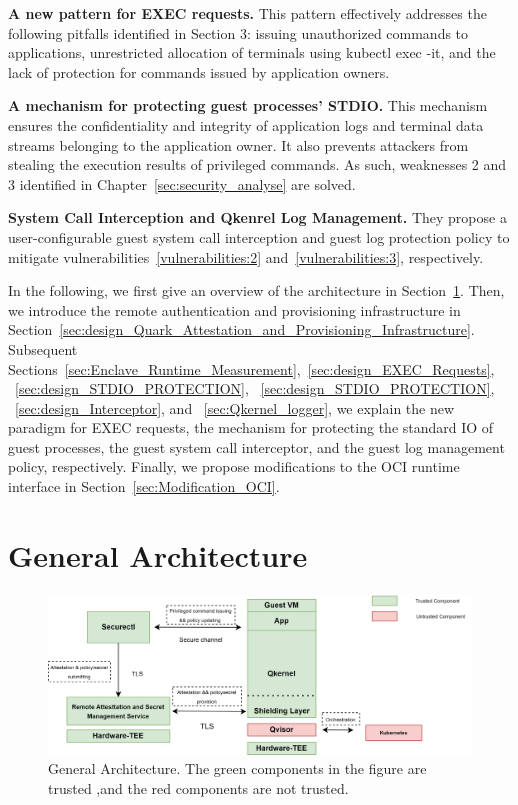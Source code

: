 \textbf{A new pattern for EXEC requests.} This pattern effectively addresses the following pitfalls identified in Section 3: issuing unauthorized commands to applications, unrestricted allocation of terminals using kubectl exec -it, and the lack of protection for commands issued by application owners.

\textbf{A mechanism for protecting guest processes' STDIO.} This mechanism ensures the confidentiality and integrity of application logs and terminal data streams belonging to the application owner. It also prevents attackers from stealing the execution results of privileged commands. As such, weaknesses 2 and 3 identified in Chapter~\ref{sec:security_analyse} are solved.

\textbf{System Call Interception and Qkenrel Log Management.} They propose a user-configurable guest system call interception and guest log protection policy to mitigate vulnerabilities~\ref{vulnerabilities:2} and~\ref{vulnerabilities:3}, respectively.
 
In the following, we first give an overview of the architecture in Section~\ref{sec:General_Architecture}. Then, we introduce the remote authentication and provisioning infrastructure in Section~\ref{sec:design_Quark_Attestation_and_Provisioning_Infrastructure}. Subsequent Sections~\ref{sec:Enclave_Runtime_Measurement},~\ref{sec:design_EXEC_Requests},
~\ref{sec:design_STDIO_PROTECTION}, ~\ref{sec:design_STDIO_PROTECTION}, ~\ref{sec:design_Interceptor}, and ~\ref{sec:Qkernel_logger}, we explain the new paradigm for EXEC requests, the 
mechanism for protecting the standard IO of guest processes, the guest system call interceptor, and the guest log management policy, respectively. Finally, we propose modifications to the OCI runtime interface in Section~\ref{sec:Modification_OCI}.


\section{General Architecture}
\label{sec:General_Architecture}
\begin{figure}[htp]
    \centering
    \includegraphics[height=0.3\textheight, width=1\textwidth]{images/genaral_architechture.png}
    \caption[General Architecture]{General Architecture. The green components in the figure are trusted ,and the red components are not trusted.}
    \label{fig:genaral_architechture}
\end{figure}

